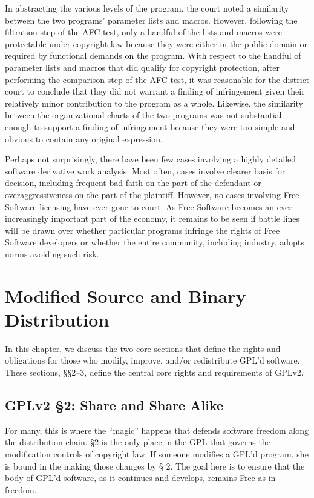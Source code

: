 In abstracting the various levels of the program, the court noted a
similarity between the two programs' parameter lists and macros. However,
following the filtration step of the AFC test, only a handful of the lists
and macros were protectable under copyright law because they were either
in the public domain or required by functional demands on the
program. With respect to the handful of parameter lists and macros that
did qualify for copyright protection, after performing the comparison step
of the AFC test, it was reasonable for the district court to conclude that
they did not warrant a finding of infringement given their relatively minor
contribution to the program as a whole. Likewise, the similarity between
the organizational charts of the two programs was not substantial enough
to support a finding of infringement because they were too simple and
obvious to contain any original expression.

Perhaps not surprisingly, there have been few cases involving a highly
detailed software derivative work analysis. Most often, cases involve
clearer basis for decision, including frequent bad faith on the part of
the defendant or overaggressiveness on the part of the plaintiff.
However, no cases involving Free Software licensing have ever gone to
court. As Free Software becomes an ever-increasingly important part of
the economy, it remains to be seen if battle lines will be
drawn over whether particular programs infringe the rights of Free
Software developers or whether the entire community, including industry,
adopts norms avoiding such risk.


\chapter{Modified Source and Binary Distribution}
\label{source-and-binary}

In this chapter, we discuss the two core sections that define the rights
and obligations for those who modify, improve, and/or redistribute GPL'd
software. These sections, \S\S 2--3, define the central core rights and
requirements of GPLv2\@.

\section{GPLv2 \S 2: Share and Share Alike}

For many, this is where the ``magic'' happens that defends software
freedom along the distribution chain. \S 2 is the only place in the GPL
that governs the modification controls of copyright law. If someone
modifies a GPL'd program, she is bound in the making those changes by \S
2. The goal here is to ensure that the body of GPL'd software, as it
continues and develops, remains Free as in freedom.


